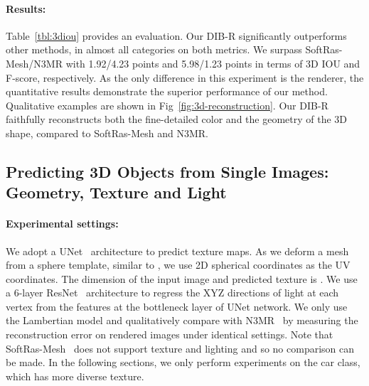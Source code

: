 \documentclass{article}
\newcommand{\model}{DIB-R}
\begin{document}
\begin{minipage}[t] {0.09\textwidth}
\vspace{-5pt}
\paragraph{Results:} Table~\ref{tbl:3diou} provides an evaluation. Our {\model} significantly outperforms other methods, in almost all categories on both metrics. We surpass SoftRas-Mesh/N3MR with 1.92/4.23 points and 5.98/1.23 points in terms of 3D IOU and F-score, respectively. As the only difference in this experiment is the renderer, the quantitative results demonstrate the superior performance of our method. Qualitative examples are shown in Fig~\ref{fig:3d-reconstruction}. Our {\model} faithfully reconstructs both the fine-detailed color and the geometry of the 3D shape, compared to SoftRas-Mesh and N3MR. 


\vspace{-8pt}
\subsection{Predicting 3D Objects from Single Images: Geometry, Texture and Light}
\vspace{-7pt}

\paragraph{Experimental settings:}

We adopt a UNet~\cite{ronneberger2015u} architecture to predict texture maps. As we deform a mesh from a sphere template, similar to \cite{kanazawa2018learning}, we use 2D spherical coordinates as the UV coordinates. The dimension of the input image and predicted texture is .  We use a 6-layer ResNet~\cite{he2016deep} architecture to regress the XYZ directions of light at each vertex from the features at the bottleneck layer of UNet network. We only use the Lambertian model and qualitatively compare with N3MR~\cite{NMR} by measuring the reconstruction error on rendered images under identical settings. Note that SoftRas-Mesh~\cite{liu2019soft} does not support texture and lighting and so no comparison can be made. In the following sections, we only perform experiments on the car class, which has more diverse texture.




\end{minipage}
\end{document}
